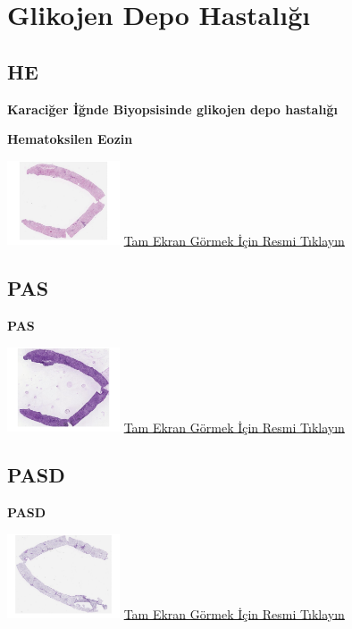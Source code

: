 \documentclass[
  letterpaper,
  DIV=11,
  numbers=noendperiod]{scrreprt}
\begin{document}
\hypertarget{sec-glikojen-depo-hastaligi}{%
\section{Glikojen Depo Hastalığı}\label{sec-glikojen-depo-hastaligi}}

\hypertarget{he}{%
\subsection{HE}\label{he}}

\textbf{Karaciğer İğnde Biyopsisinde glikojen depo hastalığı}

\textbf{Hematoksilen Eozin}

\href{https://images.patolojiatlasi.com/glycogenstorage/HE.html}{\includegraphics[width=0.25\textwidth,height=\textheight]{./screenshots/thumbnail_glycogenstorage-HE.png}}
\href{https://images.patolojiatlasi.com/glycogenstorage/HE.html}{Tam
Ekran Görmek İçin Resmi Tıklayın}

\hypertarget{pas}{%
\subsection{PAS}\label{pas}}

\textbf{PAS}

\href{https://images.patolojiatlasi.com/glycogenstorage/PAS.html}{\includegraphics[width=0.25\textwidth,height=\textheight]{./screenshots/thumbnail_glycogenstorage-PAS.png}}
\href{https://images.patolojiatlasi.com/glycogenstorage/PAS.html}{Tam
Ekran Görmek İçin Resmi Tıklayın}

\hypertarget{pasd}{%
\subsection{PASD}\label{pasd}}

\textbf{PASD}

\href{https://images.patolojiatlasi.com/glycogenstorage/PASD.html}{\includegraphics[width=0.25\textwidth,height=\textheight]{./screenshots/thumbnail_glycogenstorage-PASD.png}}
\href{https://images.patolojiatlasi.com/glycogenstorage/PASD.html}{Tam
Ekran Görmek İçin Resmi Tıklayın}
\end{document}
